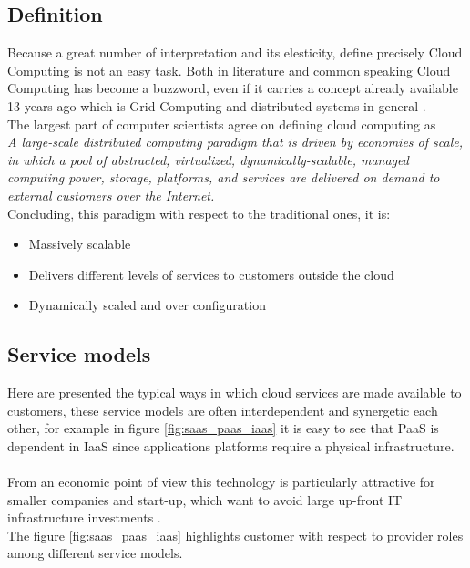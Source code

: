 \subsection{Definition}
Because a great number of interpretation and its elesticity, define precisely Cloud Computing is not an easy task. Both in literature and common speaking Cloud Computing has become a buzzword, even if it carries a concept already available 13 years ago which is Grid Computing and distributed systems in general \cite{foster}.\\
The largest part of computer scientists agree on defining cloud computing as\\
\textit{A large-scale distributed computing paradigm that is driven by economies of scale, in which a pool of abstracted, virtualized, dynamically-scalable, managed computing power, storage, platforms, and services are delivered on demand to external customers over the Internet.}\cite{foster}\\
Concluding, this paradigm with respect to the traditional ones, it is:
\begin{itemize}
    \item Massively scalable
    \item Delivers different levels of services to customers outside the cloud
    \item Dynamically scaled and over configuration
\end{itemize}

\subsection{Service models}
Here are presented the typical ways in which cloud services are made available to customers, these service models are often interdependent and synergetic each other, for example in figure \ref{fig:saas_paas_iaas} it is easy to see that PaaS is dependent in IaaS since applications platforms require a physical infrastructure.\\ \\
From an economic point of view this technology is particularly attractive for smaller companies and start-up, which want to avoid large up-front IT infrastructure investments \cite{CloudComputingModels}.\\
The figure \ref{fig:saas_paas_iaas} highlights customer with respect to provider roles among different service models.

